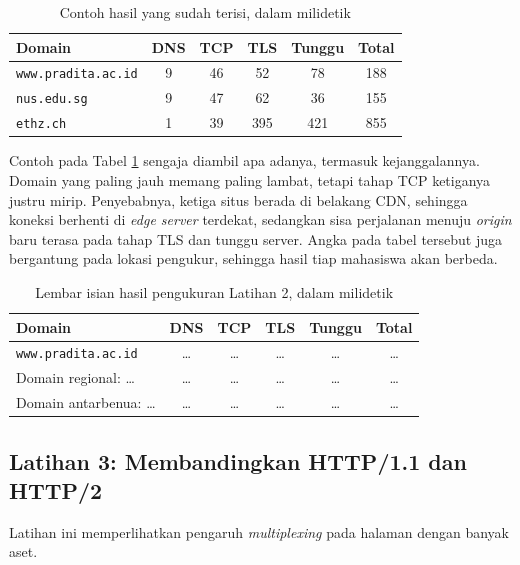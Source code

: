 \begin{table}[!htb]
  \centering
  \caption{Contoh hasil yang sudah terisi, dalam milidetik}
  \label{tab:lat1-contoh}
  \begin{tabularx}{\textwidth}{Xccccc}
    \hline
    \textbf{Domain} & \textbf{DNS} & \textbf{TCP} & \textbf{TLS} & \textbf{Tunggu} & \textbf{Total} \\
    \hline
    \texttt{www.pradita.ac.id} & 9 & 46 & 52 & 78 & 188 \\
    \hline
    \texttt{nus.edu.sg} & 9 & 47 & 62 & 36 & 155 \\
    \hline
    \texttt{ethz.ch} & 1 & 39 & 395 & 421 & 855 \\
    \hline
  \end{tabularx}
\end{table}

Contoh pada Tabel \ref{tab:lat1-contoh} sengaja diambil apa adanya, termasuk
kejanggalannya. Domain yang paling jauh memang paling lambat, tetapi tahap TCP
ketiganya justru mirip. Penyebabnya, ketiga situs berada di belakang CDN,
sehingga koneksi berhenti di \textit{edge server} terdekat, sedangkan sisa
perjalanan menuju \textit{origin} baru terasa pada tahap TLS dan tunggu server.
Angka pada tabel tersebut juga bergantung pada lokasi pengukur, sehingga hasil
tiap mahasiswa akan berbeda.

\begin{table}[!htb]
  \centering
  \caption{Lembar isian hasil pengukuran Latihan 2, dalam milidetik}
  \label{tab:lat1-hasil}
  \begin{tabularx}{\textwidth}{Xccccc}
    \hline
    \textbf{Domain} & \textbf{DNS} & \textbf{TCP} & \textbf{TLS} & \textbf{Tunggu} & \textbf{Total} \\
    \hline
    \texttt{www.pradita.ac.id} & \dots & \dots & \dots & \dots & \dots \\
    \hline
    Domain regional: \dots & \dots & \dots & \dots & \dots & \dots \\
    \hline
    Domain antarbenua: \dots & \dots & \dots & \dots & \dots & \dots \\
    \hline
  \end{tabularx}
\end{table}

\subsection*{Latihan 3: Membandingkan HTTP/1.1 dan HTTP/2}

Latihan ini memperlihatkan pengaruh \textit{multiplexing} pada halaman dengan
banyak aset.

